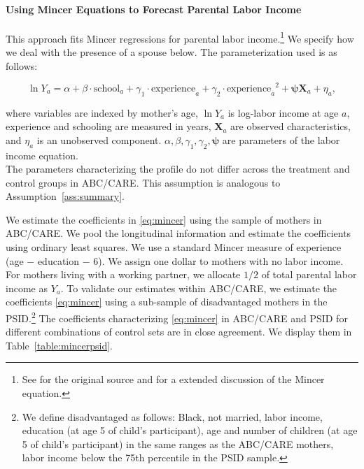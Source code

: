 \paragraph{Using Mincer Equations to Forecast Parental Labor Income} \label{appendix:mincerpar}

\noindent This approach fits Mincer regressions for parental labor income.\footnote{See \citet{Mincer_1974_schooling} for the original source and \citet{Heckman_Lochner_ea_2006_HEE} for a extended discussion of the Mincer equation.} We specify how we deal with the presence of a spouse below. The parameterization used is as follows:

\begin{equation}
\ln Y_{a} = \alpha + \beta \cdot \text{school}_{a} + \gamma_{1}  \cdot \text{experience}_{a} + \gamma_{2} \cdot {\text{experience}_{a}}^2 + \bm{\psi} \mathbf{X}_{a} + \eta_{a}, \label{eq:mincer}
\end{equation}

\noindent where variables are indexed by mother's age, $\ln Y_a$ is log-labor income at age $a$, experience and schooling are measured in years, $ \mathbf{X}_{a}$ are observed characteristics, and $\eta_{a}$ is an unobserved component. $\alpha, \beta, \gamma_{1}, \gamma_{2}, \bm{\psi}$ are parameters of the labor income equation. \\

\noindent The parameters characterizing the profile do not differ across the treatment and control groups in ABC/CARE. This assumption is analogous to Assumption~\ref{ass:summary}.

\noindent We estimate the coefficients in \eqref{eq:mincer} using the sample of mothers in ABC/CARE. We pool the longitudinal information and estimate the coefficients using ordinary least squares. We use a standard Mincer measure of experience (age $-$ education $-$ 6). We assign one dollar to mothers with no labor income. For mothers living with a working partner, we allocate $1/2$ of total parental labor income as $Y_{a}$. To validate our estimates within ABC/CARE, we estimate the coefficients \eqref{eq:mincer} using a sub-sample of disadvantaged mothers in the PSID.\footnote{We define disadvantaged as follows: Black, not married, labor income, education (at age 5 of child's participant), age and number of children (at age 5 of child's participant) in the same ranges as the ABC/CARE mothers, labor income below the 75th percentile in the PSID sample.} The coefficients characterizing \eqref{eq:mincer} in ABC/CARE and PSID for different combinations of control sets are in close agreement. We display them in Table~\ref{table:mincerpsid}.

